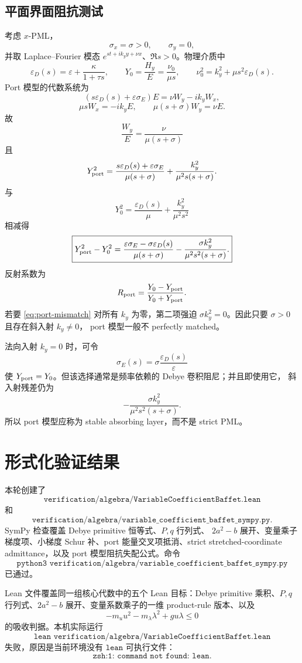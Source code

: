 \documentclass[UTF8,a4paper,11pt]{ctexart}
\newcommand{\sx}{\sigma_x}
\newcommand{\sy}{\sigma_y}
\newcommand{\eps}{\varepsilon}
\begin{document}
\subsection{平面界面阻抗测试}

考虑 \(x\)-PML，
\[
\sx=\sigma>0,\qquad \sy=0,
\]
并取 Laplace--Fourier 模态 \(e^{st+ik_y y+\nu x}\)、\(\Re s>0\)。物理介质中
\[
\eps_D(s)=\eps+\frac{\kappa}{1+\tau s},\qquad
Y_0=\frac{H_y}{E}=\frac{\nu_0}{\mu s},\qquad
\nu_0^2=k_y^2+\mu s^2\eps_D(s).
\]
Port 模型的代数系统为
\[
(s\eps_D(s)+\eps\sigma_E)E=\nu W_y-ik_yW_x,
\]
\[
\mu sW_x=-ik_yE,\qquad \mu(s+\sigma)W_y=\nu E.
\]
故
\[
\frac{W_y}{E}=\frac{\nu}{\mu(s+\sigma)}
\]
且
\[
Y_{\rm port}^2
=\frac{s\eps_D(s)+\eps\sigma_E}{\mu(s+\sigma)}
+\frac{k_y^2}{\mu^2s(s+\sigma)}.
\]
与
\[
Y_0^2=\frac{\eps_D(s)}{\mu}+\frac{k_y^2}{\mu^2s^2}
\]
相减得
\begin{equation}
\boxed{
Y_{\rm port}^2-Y_0^2
=\frac{\eps\sigma_E-\sigma\eps_D(s)}{\mu(s+\sigma)}
-\frac{\sigma k_y^2}{\mu^2s^2(s+\sigma)}.}
\label{eq:port-mismatch}
\end{equation}
反射系数为
\[
R_{\rm port}=\frac{Y_0-Y_{\rm port}}{Y_0+Y_{\rm port}}.
\]
若要 \eqref{eq:port-mismatch} 对所有 \(k_y\) 为零，第二项强迫
\(\sigma k_y^2=0\)。因此只要 \(\sigma>0\) 且存在斜入射 \(k_y\ne0\)，
port 模型一般不 perfectly matched。

法向入射 \(k_y=0\) 时，可令
\[
\sigma_E(s)=\sigma\frac{\eps_D(s)}{\eps}
\]
使 \(Y_{\rm port}=Y_0\)。但该选择通常是频率依赖的 Debye 卷积阻尼；并且即使用它，
斜入射残差仍为
\[
-\frac{\sigma k_y^2}{\mu^2s^2(s+\sigma)}.
\]
所以 port 模型应称为 stable absorbing layer，而不是 strict PML。

\section{形式化验证结果}

本轮创建了
\[
\texttt{verification/algebra/VariableCoefficientBaffet.lean}
\]
和
\[
\texttt{verification/algebra/variable\_coefficient\_baffet\_sympy.py}.
\]
SymPy 检查覆盖 Debye primitive 恒等式、\(P,q\) 行列式、
\(2a^2-b\) 展开、变量乘子梯度项、小梯度 Schur 补、port 能量交叉项抵消、strict
stretched-coordinate admittance，以及 port 模型阻抗失配公式。命令
\[
\texttt{python3 verification/algebra/variable\_coefficient\_baffet\_sympy.py}
\]
已通过。

Lean 文件覆盖同一组核心代数中的五个 Lean 目标：Debye primitive 乘积、\(P,q\)
行列式、\(2a^2-b\) 展开、变量系数乘子的一维 product-rule 版本、以及
\[
-m_u u^2-m_\lambda\lambda^2+g u\lambda\le0
\]
的吸收判据。本机实际运行
\[
\texttt{lean verification/algebra/VariableCoefficientBaffet.lean}
\]
失败，原因是当前环境没有 \(\texttt{lean}\) 可执行文件：
\[
\texttt{zsh:1: command not found: lean}.
\]
\end{document}
